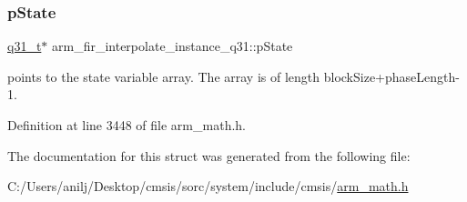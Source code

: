 \mbox{\label{structarm__fir__interpolate__instance__q31_addde04514b6e6ac72be3d609f0398b1a}} 
\subsubsection{\texorpdfstring{p\+State}{pState}}
{\footnotesize\ttfamily \hyperlink{arm__math_8h_adc89a3547f5324b7b3b95adec3806bc0}{q31\+\_\+t}$\ast$ arm\+\_\+fir\+\_\+interpolate\+\_\+instance\+\_\+q31\+::p\+State}

points to the state variable array. The array is of length block\+Size+phase\+Length-\/1. 

Definition at line 3448 of file arm\+\_\+math.\+h.



The documentation for this struct was generated from the following file\+:\begin{DoxyCompactItemize}
\item 
C\+:/\+Users/anilj/\+Desktop/cmsis/sorc/system/include/cmsis/\hyperlink{arm__math_8h}{arm\+\_\+math.\+h}\end{DoxyCompactItemize}

